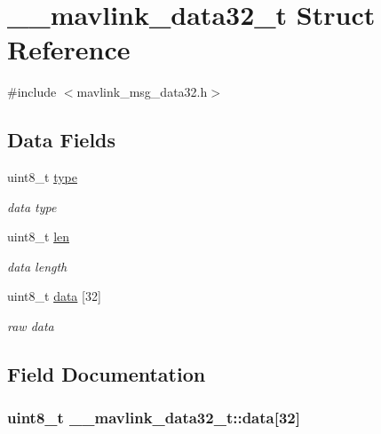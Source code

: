 \hypertarget{struct____mavlink__data32__t}{\section{\+\_\+\+\_\+mavlink\+\_\+data32\+\_\+t Struct Reference}
\label{struct____mavlink__data32__t}
}


{\ttfamily \#include $<$mavlink\+\_\+msg\+\_\+data32.\+h$>$}

\subsection*{Data Fields}
\begin{DoxyCompactItemize}
\item 
uint8\+\_\+t \hyperlink{struct____mavlink__data32__t_a9374e2028b27751e3f49239c83d9be27}{type}
\begin{DoxyCompactList}\small\item\em data type \end{DoxyCompactList}\item 
uint8\+\_\+t \hyperlink{struct____mavlink__data32__t_a04a974c0976a09a529290eb85be7f415}{len}
\begin{DoxyCompactList}\small\item\em data length \end{DoxyCompactList}\item 
uint8\+\_\+t \hyperlink{struct____mavlink__data32__t_aa79245909d2cf25611f1acee4775097d}{data} \mbox{[}32\mbox{]}
\begin{DoxyCompactList}\small\item\em raw data \end{DoxyCompactList}\end{DoxyCompactItemize}


\subsection{Field Documentation}
\hypertarget{struct____mavlink__data32__t_aa79245909d2cf25611f1acee4775097d}{
\subsubsection[{data}]{\setlength{\rightskip}{0pt plus 5cm}uint8\+\_\+t \+\_\+\+\_\+mavlink\+\_\+data32\+\_\+t\+::data\mbox{[}32\mbox{]}}}\label{struct____mavlink__data32__t_aa79245909d2cf25611f1acee4775097d}



